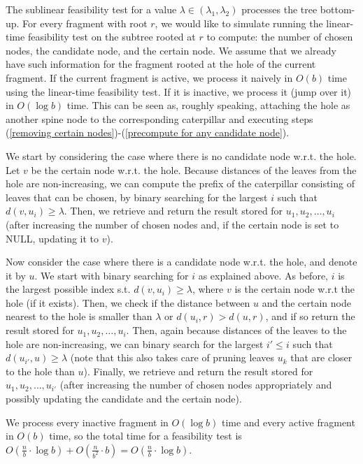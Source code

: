 \documentclass[11pt,a4paper]{article}
\theoremstyle{definition}
\theoremstyle{remark}
\begin{document}
The sublinear feasibility test for a value $\lambda \in (\lambda_1,\lambda_2)$ processes the tree bottom-up. For every fragment with root $r$, we would like to simulate running the
linear-time feasibility test on the subtree rooted at $r$ to compute: the number of chosen nodes, the candidate node, and the certain
node. We assume that we already have such information for the fragment rooted at the hole of the current fragment.
If the current fragment is active, we process it naively in $O(b)$ time
using the linear-time feasibility test. If it is inactive, we process it (jump over it) in $O(\log b)$ time.
This can be seen as, roughly speaking, attaching the hole as another spine node to the corresponding caterpillar and executing steps
(\ref{removing certain nodes})-(\ref{precompute for any candidate node}).

We start by considering the case where there is no candidate node w.r.t. the hole. Let $v$ be the certain node w.r.t. the hole.
Because distances of the leaves from the hole are non-increasing,  we can compute the prefix of the caterpillar consisting of
leaves that can be chosen, by binary searching for the largest $i$ such that $d(v,u_{i})\geq \lambda$. Then, we retrieve and return the result
stored for $u_{1},u_{2},\ldots,u_{i}$ (after increasing the number of chosen nodes and, if the certain node is set to NULL, updating it to $v$).

Now consider the case where there is a candidate node w.r.t. the hole, and denote it by $u$. We start with binary searching for $i$ as explained above. As before, $i$ is the largest possible index s.t. $d(v,u_{i})\geq \lambda$, where $v$ is the certain node w.r.t the hole (if it exists). Then,
we check if the distance between $u$ and the certain node nearest to the hole is smaller than $\lambda$ or
$d(u_{i},r)>d(u,r)$, and if so return the result stored for $u_{1},u_{2},\ldots,u_{i}$. Then, again because distances of the leaves
to the hole are non-increasing, we can binary search for the largest $i'\leq i$ such that $d(u_{i'},u)\geq \lambda$
(note that this also takes care of pruning leaves $u_{k}$ that are closer to the hole than $u$).
Finally, we retrieve and return the result stored for $u_{1},u_{2},\ldots,u_{i'}$ (after increasing the number of chosen nodes appropriately and possibly updating the candidate and the certain node).

We process every inactive fragment in $O(\log b)$ time and every active fragment in $O(b)$ time, so the total time for a feasibility test is
$O(\frac{n}{b} \cdot \log b) + O(\frac{n}{b^2} \cdot b) = O(\frac{n}{b}\cdot \log b)$.
\end{document}
